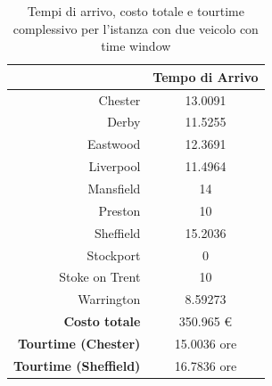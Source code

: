 
		\begin{table}[H]
			\tiny
			\centering
			\begin{tabular}{rc}

				\toprule
				& Tempo di Arrivo \\

				\midrule
				Chester & 13.0091 \\
				Derby  & 11.5255 \\
				Eastwood & 12.3691 \\
				Liverpool  & 11.4964 \\
				Mansfield & 14 \\
				Preston & 10 \\
				Sheffield & 15.2036 \\
				Stockport & 0 \\
				Stoke on Trent & 10 \\
				Warrington & 8.59273 \\

				\midrule
				\textbf{Costo totale} & 350.965 € \\
				\textbf{Tourtime (Chester)} & 15.0036 ore \\
				\textbf{Tourtime (Sheffield)} & 16.7836 ore \\
				\bottomrule
			\end{tabular}
			\label{table:instance_4_totale}
			\caption{Tempi di arrivo, costo totale e tourtime complessivo per l'istanza con due veicolo con time window}
		\end{table}

